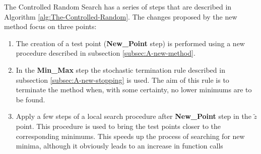 \documentclass[symmetry,article,submit,moreauthors,pdftex]{Definitions/mdpi}
\begin{document}
The Controlled Random Search has a series of steps that are described
in Algorithm \ref{alg:The-Controlled-Random}. The changes proposed
by the new method focus on three points:
\begin{enumerate}
\item The creation of a test point (\textbf{New\_Point} step)
is performed using a new procedure  described in subsection \ref{subsec:A-new-method}.
\item In the \textbf{Min\_Max} step the stochastic termination rule described
in subsection \ref{subsec:A-new-stopping} is used. The aim of this
rule is to terminate the method when, with some certainty, no lower
minimums are to be found. 
\item Apply a few steps of a local search procedure after \textbf{New\_Point}
step in the $\tilde{z}$ point. This procedure is used to bring the
test points closer to the corresponding minimums. This speeds up the
process of searching for new minima, although it obviously leads to
an increase in function calls 
\end{enumerate}
\end{document}
